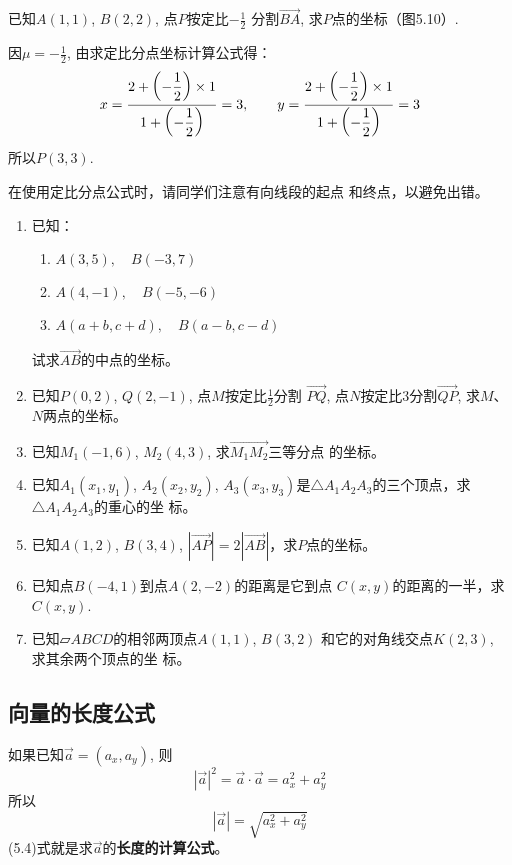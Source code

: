\begin{example}
    已知$A(1,1)$, $B(2,2)$, 点$P$按定比$-\frac{1}{2}$
分割$\Vec{BA}$, 求$P$点的坐标（图5.10）.
\end{example}

\begin{solution}
因$\mu=-\frac{1}{2}$, 由求定比分点坐标计算公式得：
\[
    x=\dfrac{2+\left(-\dfrac{1}{2}\right)\times 1}{1+\left(-\dfrac{1}{2}\right)}=3,\qquad
    y=\dfrac{2+\left(-\dfrac{1}{2}\right)\times 1}{1+\left(-\dfrac{1}{2}\right)}=3
\]
所以$P(3,3)$.
\end{solution}

在使用定比分点公式时，请同学们注意有向线段的起点
和终点，以避免出错。

\begin{ex}
\begin{enumerate}
    \item 已知：
\begin{enumerate}
    \item $A(3,5),\quad B(-3,7)$
    \item $A(4,-1),\quad B(-5,-6)$
    \item $A(a+b,c+d),\quad B(a-b,c-d)$
\end{enumerate}
    试求$\Vec{AB}$的中点的坐标。
    \item 已知$P(0,2)$, $Q(2,-1)$, 点$M$按定比$\frac{1}{2}$分割
    $\Vec{PQ}$, 点$N$按定比3分割$\Vec{QP}$, 求$M$、$N$两点的坐标。
    \item 已知$M_1(-1,6)$, $M_2(4,3)$, 求$\Vec{M_1M_2}$三等分点
    的坐标。
    \item 已知$A_1(x_1,y_1)$, $A_2(x_2,y_2)$, $A_3(x_3,y_3)$是$\triangle A_1A_2A_3$的三个顶点，求$\triangle A_1A_2A_3$的重心的坐
    标。
    \item 已知$A(1,2)$, $B(3,4)$, 
    $|\Vec{AP}|=2|\Vec{AB}|$，求$P$点的坐标。
    \item 已知点$B(-4,1)$到点$A(2,-2)$的距离是它到点
    $C(x,y)$的距离的一半，求$C(x,y)$.
    \item 已知$\parallelogram{ABCD}$的相邻两顶点$A(1,1)$, $B(3,2)$
    和它的对角线交点$K(2,3)$, 求其余两个顶点的坐
    标。
\end{enumerate}
\end{ex}

\subsection{向量的长度公式}
如果已知$\vec{a}=(a_x,a_y)$, 则
\[|\vec{a}|^2=\vec{a}\cdot \vec{a}=a_x^2+a^2_y\]
所以
\begin{equation}
    |\vec{a}|=\sqrt{a_x^2+a^2_y}
\end{equation}
(5.4)式就是求$\vec{a}$的\textbf{长度的计算公式}。

